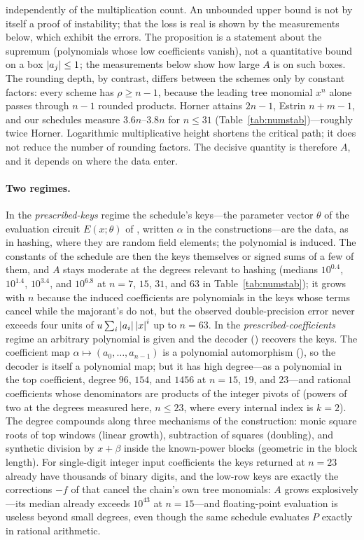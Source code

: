 independently of the multiplication count.  An unbounded upper bound is not
by itself a proof of instability; that the loss is real is shown by the
measurements below, which exhibit the errors.  The proposition is a
statement about the supremum (polynomials whose low coefficients vanish),
not a quantitative bound on a box $\left\lvert a_j\right\rvert\le1$; the measurements below
show how large $A$ is on such boxes.
The rounding depth, by contrast,
differs between the schemes only by constant factors: every scheme has
$\rho\ge n-1$, because the leading tree monomial $x^n$ alone passes through
$n-1$ rounded products.  Horner attains $2n-1$, Estrin $n+m-1$, and our
schedules measure $3.6n$--$3.8n$ for $n\le31$
(Table~\ref{tab:numstab})---roughly twice Horner.  Logarithmic multiplicative
height shortens the critical path; it does not reduce the number of rounding
factors.  The decisive quantity is therefore $A$, and it depends on where the
data enter.

\paragraph{Two regimes.}
In the \emph{prescribed-keys} regime the schedule's keys---the parameter
vector $\theta$ of the evaluation circuit $E(x;\theta)$ of
, written $\alpha$ in the constructions---are the data, as in
hashing, where they are random field elements; the polynomial is induced.  The
constants of the schedule are then the keys themselves or signed sums of a few
of them, and $A$ stays moderate at the degrees relevant to hashing (medians
$10^{0.4}$, $10^{1.4}$, $10^{3.4}$, and $10^{6.8}$ at $n=7$, $15$, $31$, and
$63$ in Table~\ref{tab:numstab}); it grows with $n$ because the induced
coefficients are polynomials in the keys whose terms cancel while the
majorant's do not, but the observed double-precision error never exceeds four
units of $u\sum_i\left\lvert a_i\right\rvert\left\lvert x\right\rvert^i$ up to $n=63$.  In the
\emph{prescribed-coefficients} regime an arbitrary polynomial is given and the
decoder () recovers the keys.  The coefficient map
$\alpha\mapsto(a_0,\dots,a_{n-1})$ is a polynomial automorphism
(), so the decoder is itself a
polynomial map; but it has high degree---as a polynomial in the top
coefficient, degree $96$, $154$, and $1456$ at $n=15$, $19$, and $23$---and
rational coefficients whose denominators are products of the integer pivots of
 (powers of two at the degrees measured here, $n\le23$, where every internal index is $k=2$).  The degree compounds along three mechanisms of the
construction: monic square roots of top windows (linear growth), subtraction
of squares (doubling), and synthetic division by $x+\beta$ inside the
known-power blocks (geometric in the block length).  For single-digit integer
input coefficients the keys returned at $n=23$ already have thousands of
binary digits, and the low-row keys are exactly the corrections $-f$ of
 that cancel the chain's own tree monomials:
$A$ grows
explosively---its median already exceeds $10^{43}$ at $n=15$---and
floating-point evaluation is useless beyond small degrees, even though the
same schedule evaluates $P$ exactly in rational arithmetic.

